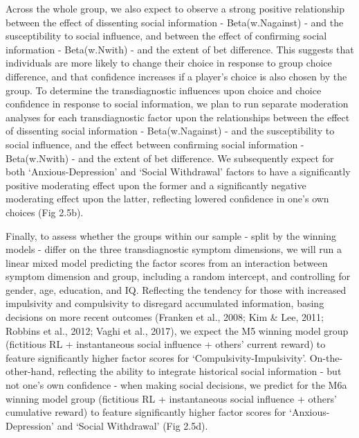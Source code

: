 \documentclass[12pt,a4paper,oneside,]{book} %
\begin{document}
Across the whole group, we also expect to observe a strong positive relationship between the effect of dissenting social information - Beta(w.Nagainst) - and the susceptibility to social influence, and between the effect of confirming social information - Beta(w.Nwith) - and the extent of bet difference. This suggests that individuals are more likely to change their choice in response to group choice difference, and that confidence increases if a player's choice is also chosen by the group. To determine the transdiagnostic influences upon choice and choice confidence in response to social information, we plan to run separate moderation analyses for each transdiagnostic factor upon the relationships between the effect of dissenting social information - Beta(w.Nagainst) - and the susceptibility to social influence, and the effect between confirming social information - Beta(w.Nwith) - and the extent of bet difference. We subsequently expect for both `Anxious-Depression' and `Social Withdrawal' factors to have a significantly positive moderating effect upon the former and a significantly negative moderating effect upon the latter, reflecting lowered confidence in one's own choices (Fig 2.5b).

Finally, to assess whether the groups within our sample - split by the winning models - differ on the three transdiagnostic symptom dimensions, we will run a linear mixed model predicting the factor scores from an interaction between symptom dimension and group, including a random intercept, and controlling for gender, age, education, and IQ. Reflecting the tendency for those with increased impulsivity and compulsivity to disregard accumulated information, basing decisions on more recent outcomes (Franken et al., 2008; Kim \& Lee, 2011; Robbins et al., 2012; Vaghi et al., 2017), we expect the M5 winning model group (fictitious RL + instantaneous social influence + others' current reward) to feature significantly higher factor scores for `Compulsivity-Impulsivity'. On-the-other-hand, reflecting the ability to integrate historical social information - but not one's own confidence - when making social decisions, we predict for the M6a winning model group (fictitious RL + instantaneous social influence + others' cumulative reward) to feature significantly higher factor scores for `Anxious-Depression' and `Social Withdrawal' (Fig 2.5d).
\end{document}
